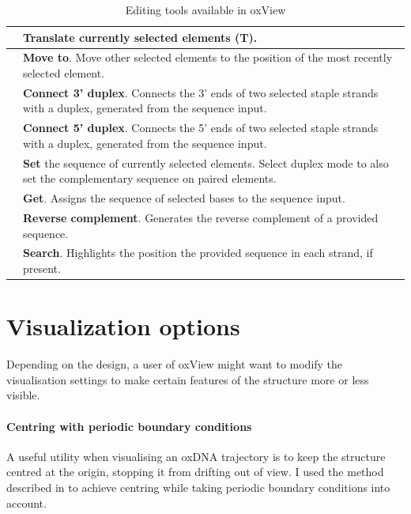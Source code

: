 \begin{table}[ht]
\begin{tabularx}{\textwidth} { >{\centering\arraybackslash}m{3em} | X }
 & \textbf{Translate} currently selected elements (T). \\ \hline
 & \textbf{Move to}. Move other selected elements to the position of the most recently selected element. \\ \hline
 & \textbf{Connect 3' duplex}. Connects the 3' ends of two selected staple strands with a duplex, generated from the sequence input. \\ \hline
 & \textbf{Connect 5' duplex}. Connects the 5' ends of two selected staple strands with a duplex, generated from the sequence input. \\ \hline
 & \textbf{Set} the sequence of currently selected elements. Select duplex mode to also set the complementary sequence on paired elements. \\ \hline
 & \textbf{Get}. Assigns the sequence of selected bases to the sequence input.  \\ \hline
 & \textbf{Reverse complement}. Generates the reverse complement of a provided sequence. \\ \hline
 & \textbf{Search}. Highlights the position the provided sequence in each strand, if present. \\ \hline
\end{tabularx}

\caption{Editing tools available in oxView}
\label{table:edit_tools}
\end{table}



\section{Visualization options}
Depending on the design, a user of oxView might want to modify the visualisation settings to make certain features of the structure more or less visible.

\paragraph{Centring with periodic boundary conditions} A useful utility when visualising an oxDNA trajectory is to keep the structure centred at the origin, stopping it from drifting out of view. I used the method described in \cite{PBC_centring} to achieve centring while taking periodic boundary conditions into account.

